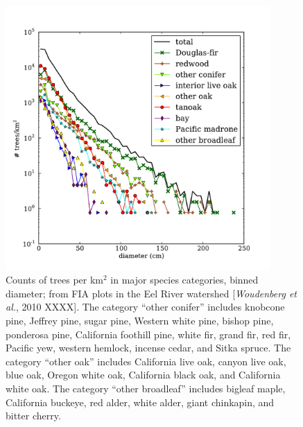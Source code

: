 \begin{figure}[here]
\includegraphics[width=0.9\textwidth]{ch1-sapflow/figures/Figure02.pdf}
\caption{Counts of trees per km$^2$ in major species categories, binned diameter; from FIA plots in the Eel River watershed [\textit{Woudenberg et al.}, 2010 XXXX].  The category ``other conifer'' includes knobcone pine, Jeffrey pine, sugar pine, Western white pine, bishop pine, ponderosa pine, California foothill pine, white fir, grand fir, red fir, Pacific yew, western hemlock, incense cedar, and Sitka spruce.  The category ``other oak'' includes California live oak, canyon live oak, blue oak, Oregon white oak, California black oak, and California white oak.  The category ``other broadleaf'' includes bigleaf maple, California buckeye, red alder, white alder, giant chinkapin, and bitter cherry.}
\label{fig:sapflow_abundances}
\end{figure}

